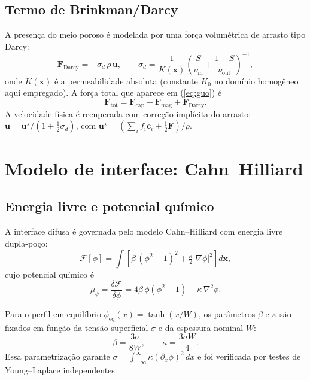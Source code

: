 \documentclass[11pt,a4paper]{article}
\begin{document}
\subsection{Termo de Brinkman/Darcy}

A presença do meio poroso é modelada por uma força volumétrica de
arrasto tipo Darcy:
\begin{equation}
    \mathbf{F}_{\mathrm{Darcy}} = -\sigma_d\,\rho\,\mathbf{u},
    \qquad
    \sigma_d = \frac{1}{K(\mathbf{x})}\!\left( \frac{S}{\nu_{\mathrm{in}}} + \frac{1-S}{\nu_{\mathrm{out}}} \right)^{-1},
\end{equation}
onde $K(\mathbf{x})$ é a permeabilidade absoluta (constante $K_0$ no domínio
homogêneo aqui empregado). A força total que aparece em
(\ref{eq:guo}) é
\begin{equation}
    \mathbf{F}_{\mathrm{tot}} = \mathbf{F}_{\mathrm{cap}}
    + \mathbf{F}_{\mathrm{mag}}
    + \mathbf{F}_{\mathrm{Darcy}}.
\end{equation}
A velocidade física é recuperada com correção implícita do arrasto:
$\mathbf{u} = \mathbf{u}^\star / (1 + \tfrac{1}{2}\sigma_d)$, com
$\mathbf{u}^\star = (\sum_i f_i \mathbf{c}_i + \tfrac{1}{2}\mathbf{F})/\rho$.

\section{Modelo de interface: Cahn--Hilliard}

\subsection{Energia livre e potencial químico}

A interface difusa é governada pelo modelo Cahn--Hilliard com energia
livre dupla-poço:
\begin{equation}
    \mathcal{F}[\phi] = \int \left[ \beta\,(\phi^2-1)^2
    + \tfrac{\kappa}{2}|\nabla\phi|^2 \right] d\mathbf{x},
\end{equation}
cujo potencial químico é
\begin{equation}
    \mu_\phi = \frac{\delta\mathcal{F}}{\delta\phi}
    = 4\beta\,\phi(\phi^2-1) - \kappa\,\nabla^2\phi.
    \label{eq:mu}
\end{equation}

Para o perfil em equilíbrio $\phi_{\mathrm{eq}}(x) = \tanh(x/W)$, os
parâmetros $\beta$ e $\kappa$ são fixados em função da tensão superficial
$\sigma$ e da espessura nominal $W$:
\begin{equation}
    \beta = \frac{3\sigma}{8W}, \qquad
    \kappa = \frac{3\sigma W}{4}.
    \label{eq:beta_kappa}
\end{equation}
Essa parametrização garante $\sigma = \int_{-\infty}^{\infty}\kappa(\partial_x\phi)^2\,dx$
e foi verificada por testes de Young--Laplace independentes.
\end{document}
